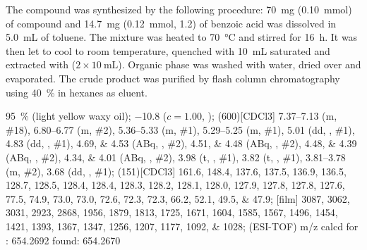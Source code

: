 The compound was synthesized by the following procedure:
\SI{70}{\milli\gram} (\SI{0.10}{\milli\mol}) of compound  and
\SI{14.7}{\milli\gram} (\SI{0.12}{\milli\mol}, \SI{1.2}{\equiv}) of benzoic acid
was dissolved in \SI{5.0}{\milli\liter} of toluene.
The mixture was heated to \SI{70}{\degreeCelsius} and stirred for \SI{16}{\hour}.
It was then let to cool to room temperature, quenched with \SI{10}{\milli\liter} saturated  and extracted with  ($2 \times \SI{10}{\milli\liter}$).
Organic phase was washed with water, dried over  and evaporated.
The crude product was purified by flash column chromatography using \SI{40}{\percent}  in hexanes as eluent.
\begin{fullexp}
	 \SI{95}{\percent} (light yellow waxy oil); 
	\data{[$\alpha^{23}_D$]~$=$} \num{-10.8} ($c = 1.00$, ); 
	\NMR(600)[CDCl3] \numrange{7.37}{7.13} (m, \#{18}), \numrange{6.80}{6.77} (m, \#{2}), \numrange{5.36}{5.33} (m, \#{1}), \numrange{5.29}{5.25} (m, \#{1}), \num{5.01} (dd, , \#{1}), \num{4.83} (dd, , \#{1}), \numlist{4.69;4.53} (ABq, , \#{2}), \numlist{4.51;4.48} (ABq, , \#{2}), \numlist{4.48;4.39} (ABq, , \#{2}), \numlist{4.34;4.01} (ABq, , \#{2}), \num{3.98} (t, , \#{1}), \num{3.82} (t, , \#{1}), \numrange{3.81}{3.78} (m, \#{2}), \num{3.68} (dd, , \#{1}); 
	(151)[CDCl3] \numlist{161.6; 148.4; 137.6; 137.5; 136.9; 136.5; 128.7; 128.5; 128.4; 128.4; 128.3; 128.2; 128.1; 128.0; 127.9; 127.8; 127.8; 127.6; 77.5; 74.9; 73.0; 73.0; 72.6; 72.3; 72.3; 66.2; 52.1; 49.5; 47.9}; 
	[film] \numlist{3087; 3062; 3031; 2923; 2868; 1956; 1879; 1813; 1725; 1671; 1604; 1585; 1567; 1496; 1454; 1421; 1393; 1367; 1347; 1256; 1207; 1177; 1092; 1028}; 
	 (ESI-TOF) m/z calcd for : \num{654.2692} found: \num{654.2670}
\end{fullexp}

